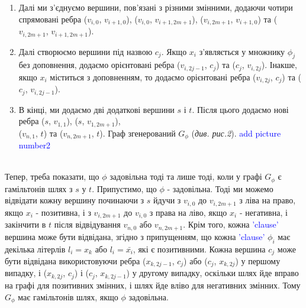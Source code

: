 \documentclass[14pt]{article}
\begin{document}
\begin{spacing}{1.175}
\begin{enumerate}
        \item  Далі ми з’єднуємо вершини, пов’язані з різними змінними, додаючи чотири спрямовані ребра (\(v_{i,0}\), \(v_{i+1,0}\)), (\(v_{i,0}\), \(v_{i+1,2m+1}\)), (\(v_{i,2m+1}\), \(v_{i+1,0}\)) та (\(v_{i,2m+1}\), \(v_{i+1,2m+1}\)).
        
        \item  Далі створюємо вершини під назвою \(c_{j}\). Якщо \(x_i\) з'являється у множнику \(\phi_{j}\) без доповнення, додаємо орієнтовані ребра
        (\(v_{i,2j-1}\), \(c_{j}\)) та (\(c_{j}\), \(v_{i,2j}\)). Інакше, якщо \(x_i\) міститься з доповненням, то додаємо орієнтовані ребра (\(v_{i,2j}\), \(c_{j}\)) та (\(c_{j}\), \(v_{i,2j-1}\)).
        
        \item В кінці, ми додаємо дві додаткові вершини \(s\) і \(t\). Після цього додаємо нові ребра (\(s\), \(v_{1,1}\)), (\(s\), \(v_{1,2m+1}\)), \\(\(v_{n,1}\), \(t\)) та (\(v_{n,2m+1}\), \(t\)). Граф згенерований \(G_{\phi}\) (\textit{див. рис.2}). \textcolor{blue}{add picture number2}        
    \end{enumerate}
    \\

    \quad Тепер, треба показати, що \(\phi\) задовільна тоді та лише тоді, коли у графі \(G_{\phi}\) є гамільтонів шлях з \(s\) у \(t\). Припустимо, що \(\phi\) - задовільна. Тоді ми можемо відвідати кожну вершину починаючи з \(s\) йдучи з \(v_{i,0}\) до \(v_{i,2m+1}\) з ліва на право, якщо \(x_i\) - позитивна, і з \(v_{i,2m+1}\) до \(v_{i,0}\) з права на ліво, якщо \(x_i\) - негативна, і закінчити в \(t\) після відвідування \(v_{n,0}\) або \(v_{n,2m+1}\). Крім того, кожна \textcolor{blue}{'clause'} вершина може бути відвідана, згідно з припущенням, що кожна \textcolor{blue}{'clause'} \(\phi_{i}\) має декілька літерлів \(l_i = x_k\) або \(l_i = \bar{x_i}\), які є позитивними. Кожна вершина \(c_j\) може бути відвідана використовуючи ребра (\(x_{k,2j-1}\), \(c_{j}\)) або (\(c_{j}\), \(x_{k,2j}\)) у першому випадку, і (\(x_{k,2j}\), \(c_{j}\)) і (\(c_{j}\), \(x_{k,2j-1}\)) у другому випадку, оскільки шлях йде вправо на графі для позитивних змінних, і шлях йде вліво для негативних змінних. Тому \(G_{\phi}\) має гамільтонів шлях, якщо \(\phi\) задовільна.
    

\end{spacing}
\end{document}
